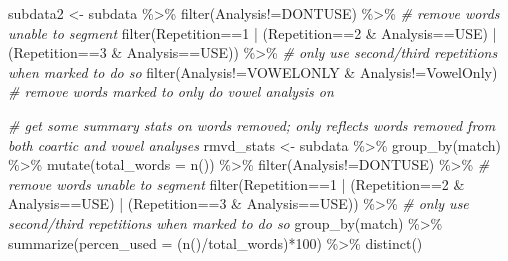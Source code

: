 \documentclass[
]{article}
\newenvironment{Shaded}{\begin{snugshade}}{\end{snugshade}}
\newcommand{\AttributeTok}[1]{\textcolor[rgb]{0.77,0.63,0.00}{#1}}
\newcommand{\CommentTok}[1]{\textcolor[rgb]{0.56,0.35,0.01}{\textit{#1}}}
\newcommand{\DecValTok}[1]{\textcolor[rgb]{0.00,0.00,0.81}{#1}}
\newcommand{\FunctionTok}[1]{\textcolor[rgb]{0.00,0.00,0.00}{#1}}
\newcommand{\NormalTok}[1]{#1}
\newcommand{\OtherTok}[1]{\textcolor[rgb]{0.56,0.35,0.01}{#1}}
\newcommand{\SpecialCharTok}[1]{\textcolor[rgb]{0.00,0.00,0.00}{#1}}
\newcommand{\StringTok}[1]{\textcolor[rgb]{0.31,0.60,0.02}{#1}}
\begin{document}
\begin{Shaded}
\begin{Highlighting}[]
\NormalTok{subdata2 }\OtherTok{\textless{}{-}}\NormalTok{ subdata }\SpecialCharTok{\%\textgreater{}\%}
  \FunctionTok{filter}\NormalTok{(Analysis}\SpecialCharTok{!=}\StringTok{\textquotesingle{}DONTUSE\textquotesingle{}}\NormalTok{) }\SpecialCharTok{\%\textgreater{}\%} \CommentTok{\# remove words unable to segment}
  \FunctionTok{filter}\NormalTok{(Repetition}\SpecialCharTok{==}\StringTok{\textquotesingle{}1\textquotesingle{}} \SpecialCharTok{|} 
\NormalTok{           (Repetition}\SpecialCharTok{==}\DecValTok{2} \SpecialCharTok{\&}\NormalTok{ Analysis}\SpecialCharTok{==}\StringTok{\textquotesingle{}USE\textquotesingle{}}\NormalTok{) }\SpecialCharTok{|} 
\NormalTok{           (Repetition}\SpecialCharTok{==}\DecValTok{3} \SpecialCharTok{\&}\NormalTok{ Analysis}\SpecialCharTok{==}\StringTok{\textquotesingle{}USE\textquotesingle{}}\NormalTok{)) }\SpecialCharTok{\%\textgreater{}\%} \CommentTok{\# only use second/third repetitions when marked to do so}
  \FunctionTok{filter}\NormalTok{(Analysis}\SpecialCharTok{!=}\StringTok{\textquotesingle{}VOWELONLY\textquotesingle{}} \SpecialCharTok{\&}\NormalTok{ Analysis}\SpecialCharTok{!=}\StringTok{\textquotesingle{}VowelOnly\textquotesingle{}}\NormalTok{) }\CommentTok{\# remove words marked to only do vowel analysis on}

\CommentTok{\# get some summary stats on words removed; only reflects words removed from both coartic and vowel analyses}
\NormalTok{rmvd\_stats }\OtherTok{\textless{}{-}}\NormalTok{ subdata }\SpecialCharTok{\%\textgreater{}\%}
  \FunctionTok{group\_by}\NormalTok{(match) }\SpecialCharTok{\%\textgreater{}\%}
  \FunctionTok{mutate}\NormalTok{(}\AttributeTok{total\_words =} \FunctionTok{n}\NormalTok{()) }\SpecialCharTok{\%\textgreater{}\%}
  \FunctionTok{filter}\NormalTok{(Analysis}\SpecialCharTok{!=}\StringTok{\textquotesingle{}DONTUSE\textquotesingle{}}\NormalTok{) }\SpecialCharTok{\%\textgreater{}\%} \CommentTok{\# remove words unable to segment}
  \FunctionTok{filter}\NormalTok{(Repetition}\SpecialCharTok{==}\StringTok{\textquotesingle{}1\textquotesingle{}} \SpecialCharTok{|} 
\NormalTok{           (Repetition}\SpecialCharTok{==}\DecValTok{2} \SpecialCharTok{\&}\NormalTok{ Analysis}\SpecialCharTok{==}\StringTok{\textquotesingle{}USE\textquotesingle{}}\NormalTok{) }\SpecialCharTok{|} 
\NormalTok{           (Repetition}\SpecialCharTok{==}\DecValTok{3} \SpecialCharTok{\&}\NormalTok{ Analysis}\SpecialCharTok{==}\StringTok{\textquotesingle{}USE\textquotesingle{}}\NormalTok{)) }\SpecialCharTok{\%\textgreater{}\%} \CommentTok{\# only use second/third repetitions when marked to do so}
  \FunctionTok{group\_by}\NormalTok{(match) }\SpecialCharTok{\%\textgreater{}\%}
  \FunctionTok{summarize}\NormalTok{(}\AttributeTok{percen\_used =}\NormalTok{ (}\FunctionTok{n}\NormalTok{()}\SpecialCharTok{/}\NormalTok{total\_words)}\SpecialCharTok{*}\DecValTok{100}\NormalTok{) }\SpecialCharTok{\%\textgreater{}\%}
  \FunctionTok{distinct}\NormalTok{()}
\end{Highlighting}
\end{Shaded}
\end{document}
